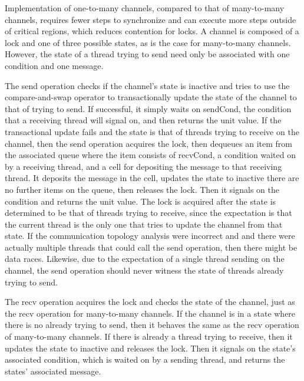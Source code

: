 \documentclass{article}
\begin{document}
Implementation of one-to-many channels, compared to that of many-to-many channels,
requires fewer
steps to synchronize and can execute more steps outside of critical regions, which reduces
contention for locks.  A channel is composed of a lock and one of three possible states, as is
the case for many-to-many channels.  However, the state of a thread trying to send need only be
associated with one condition and one message.  

The send operation checks if the channel's state is inactive and tries to use the
compare-and-swap operator to transactionally update the state of the channel to that of trying to
send.  If successful, it simply waits on sendCond, the condition that a receiving thread will
signal on, and then returns the unit value.  If the transactional update fails and the state is
that of threads trying to receive on the channel, then the send operation acquires the lock,
then dequeues an item from the associated queue where the item consists of recvCond, a
condition waited on by a receiving thread, and a cell for depositing the message to that
receiving thread.  It deposits the message in the cell, updates the state to inactive there are
no further items on the queue, then releases the lock.  Then it signals on the condition and
returns the unit value. The lock is acquired after the state is determined to be that of
threads trying to receive, since the expectation is that the current thread is the only one
that tries to update the channel from that state.  If the communication topology analysis were
incorrect and and there were actually multiple threads that could call the send operation, then
there might be data races.  Likewise, due to the expectation of a single thread sending on the
channel, the send operation should never witness the state of threads already trying to send.

The recv operation acquires the lock and checks the state of the channel, just as the recv
operation for many-to-many channels.  If the channel is in a state where there is no already
trying to send, then it behaves the same as the recv operation of many-to-many channels. If
there is already a thread trying to receive, then it updates the state to inactive and releases
the lock.  Then it signals on the state's associated condition, which is waited on by a sending
thread, and returns the states' associated message.
\end{document}
